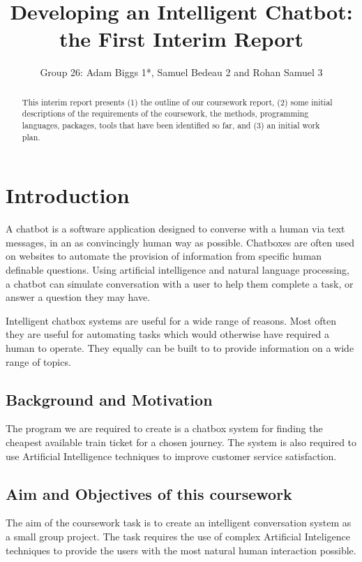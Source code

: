 \documentclass[11pt]{cmpreport}
\title{Developing an Intelligent Chatbot: the First Interim Report}
\author{Group 26: Adam Biggs 1*, Samuel Bedeau 2 and Rohan Samuel 3}
\begin{document}
\maketitle

\begin{abstract}
	This interim report presents (1) the outline of our coursework report, (2) some initial descriptions of the requirements of the coursework, the methods, programming languages, packages, tools that have been identified so far, and (3) an initial work plan.      

\end{abstract}

\section{Introduction}
A chatbot is a software application designed to converse with a human via text messages, in an as convincingly human way as possible. Chatboxes are often used on websites to automate the provision of information from specific human definable questions. Using artificial intelligence and natural language processing, a chatbot can simulate conversation with a user to help them complete a task, or answer a question they may have.

Intelligent chatbox systems are useful for a wide range of reasons. Most often they are useful for automating tasks which would otherwise have required a human to operate. They equally can be built to to provide information on a wide range of topics.

\subsection{Background and Motivation}

The program we are required to create is a chatbox system for finding the cheapest available train ticket for a chosen journey. The system is also required to use Artificial Intelligence techniques to improve customer service satisfaction. 

\subsection{Aim and Objectives of this coursework} 

The aim of the coursework task is to create an intelligent conversation system as a small group project. The task requires the use of complex Artificial Inteligence techniques to provide the users with the most natural human interaction possible.
\end{document}
